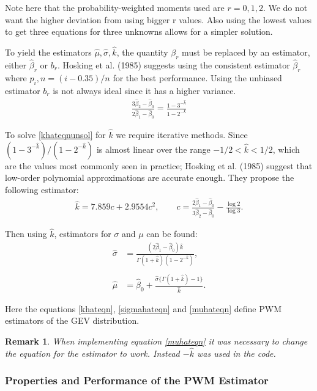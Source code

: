 \documentclass{article}
\newtheorem*{remark}{Remark}
\begin{document}
Note here that the probability-weighted moments used are $r = 0, 1, 2$. We do not want the higher deviation from using bigger r values. Also using the lowest values to get three equations for three unknowns allows for a simpler solution.

To yield the estimators $\hat{\mu}, \hat{\sigma}, \hat{k}$, the quantity $\beta_r$ must be replaced by an estimator, either $\hat{\beta}_r$ or $b_r$. Hosking et al. (1985) suggests using the consistent estimator $\hat{\beta}_r$ where $p_i,n = (i-0.35)/n$ for the best performance. Using the unbiased estimator $b_r$ is not always ideal since it has a higher variance.
\begin{align}
\frac{3\hat{\beta}_2 - \hat{\beta}_0 }{2\hat{\beta}_1 - \hat{\beta}_0 } = \frac{1 - 3^{-\hat{k}}}{1 - 2^{-\hat{k}}} \label{khateqnunsol}
\end{align}

To solve \eqref{khateqnunsol} for $\hat{k}$ we require iterative methods. Since $(1 - 3^{-\hat{k}})/(1 - 2^{-\hat{k}})$ is almost linear over the range $   -1/2< \hat{k} < 1/2 $, which are the values most commonly seen in practice; Hosking et al. (1985) suggest that low-order polynomial approximations are accurate enough. They propose the following estimator:
\begin{align}
\hat{k} = 7.859c + 2.9554c^2, \qquad c = \frac{2\hat{\beta}_1 - \hat{\beta}_0}{3\hat{\beta}_2 - \hat{\beta}_0} -\frac{\log 2}{\log 3}. \label{khateqn}
\end{align}

Then using $\hat{k}$, estimators for $\sigma$ and $\mu$ can be found:
\begin{align}
\hat{\sigma} &= \frac{(2\hat{\beta}_1 - \hat{\beta}_0)\hat{k}}{\Gamma(1+\hat{k})(1 - 2^{-\hat{k}} )}, \label{sigmahateqn} \\
\nonumber \\
\hat{\mu} &= \hat{\beta}_0 + \frac{\hat{\sigma} \{\Gamma(1+\hat{k}) - 1 \} }{\hat{k}}. \label{muhateqn}
\end{align}

Here the equations \eqref{khateqn}, \eqref{sigmahateqn} and \eqref{muhateqn} define PWM estimators of the GEV distribution.

\begin{remark}
When implementing equation \eqref{muhateqn} it was necessary to change the equation for the estimator to work. Instead $-\hat{k}$ was used in the code.   
\end{remark}

\subsubsection{Properties and Performance of the PWM Estimator}
\
\end{document}
